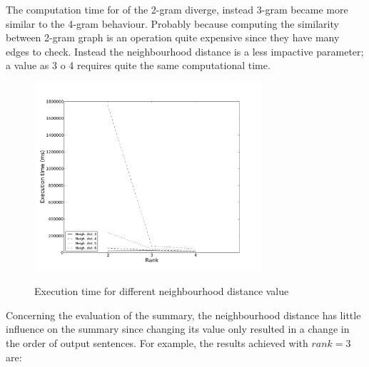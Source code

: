 The computation time for of the 2-gram diverge, instead 3-gram became more similar to the 4-gram behaviour. 
Probably because computing the similarity between 2-gram graph is an operation quite expensive since they have many edges to check.
Instead the neighbourhood distance is a less impactive parameter; a value as 3 o 4 requires quite the same computational time.

\begin{figure}[htbp]
	\centering
			{\includegraphics[width=8.5cm,height=7cm]{image/win_2_ndists.pdf}}	
					\caption[et-fixed-10days-r-nd]{Execution time for different neighbourhood distance value}
	\label{fig:et-fixed-10days-r-nd}
\end{figure} 

Concerning the evaluation of the summary, the neighbourhood distance has little
influence on the summary since changing its value only resulted in a change
in the order of output sentences. For example, the results achieved with
$rank=3$ are:

